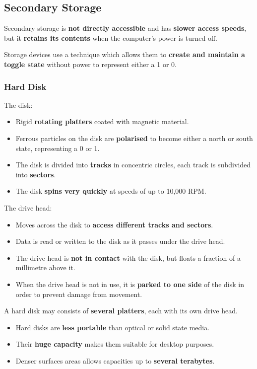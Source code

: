 \subsection{Secondary Storage}

Secondary storage is \textbf{not directly accessible} and has \textbf{slower access speeds}, but it \textbf{retains its contents} when the computer's power is turned off.

Storage devices use a technique which allows them to \textbf{create and maintain a toggle state} without power to represent either a 1 or 0.

\subsubsection*{Hard Disk}

The disk:
\begin{itemize}
    \item Rigid \textbf{rotating platters} coated with magnetic material.
    \item Ferrous particles on the disk are \textbf{polarised} to become either a north or south state, representing a 0 or 1.
    \item The disk is divided into \textbf{tracks} in concentric circles, each track is subdivided into \textbf{sectors}.
    \item The disk \textbf{spins very quickly} at speeds of up to 10,000 RPM.
\end{itemize}

The drive head:
\begin{itemize}
    \item Moves across the disk to \textbf{access different tracks and sectors}.
    \item Data is read or written to the disk as it passes under the drive head.
    \item The drive head is \textbf{not in contact} with the disk, but floats a fraction of a millimetre above it.
    \item When the drive head is not in use, it is \textbf{parked to one side} of the disk in order to prevent damage from movement.
\end{itemize}

A hard disk may consists of \textbf{several platters}, each with its own drive head.
\begin{itemize}
    \item Hard disks are \textbf{less portable} than optical or solid state media.
    \item Their \textbf{huge capacity} makes them suitable for desktop purposes.
    \item Denser surfaces areas allows capacities up to \textbf{several terabytes}.
\end{itemize}

